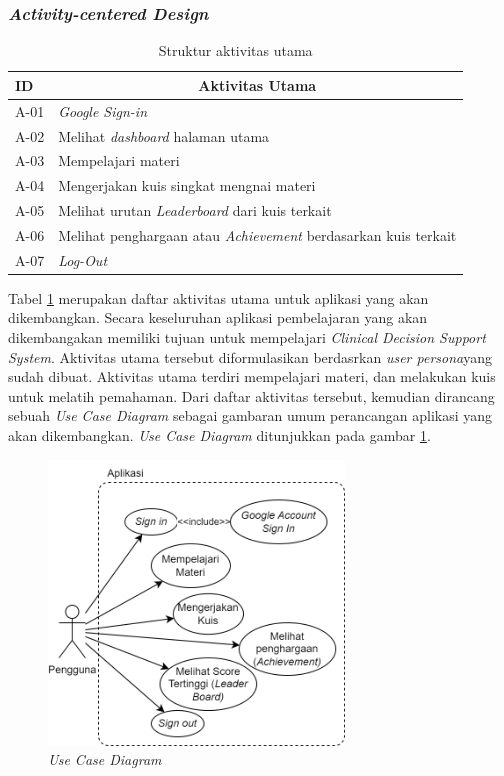\subsubsection{\textit{Activity-centered Design}}
\begin{table}[H]
	\centering
	\caption{Struktur aktivitas utama}
	\begin{tabular}{|m{1cm}|m{}|}
		\hline
		\centering \textbf{ID} & \multicolumn{1}{c|}{\centering \textbf{Aktivitas Utama}}\\
		\hline
		A-01 & \textit{Google Sign-in} \\
		\hline
		A-02 & Melihat \textit{dashboard} halaman utama\\
		\hline
		A-03 & Mempelajari materi\\
		\hline
		A-04 & Mengerjakan kuis singkat mengnai materi \\
		\hline
		A-05 & Melihat urutan \textit{Leaderboard} dari kuis terkait\\
		\hline
		A-06 & Melihat penghargaan atau \textit{Achievement} berdasarkan kuis terkait \\
		\hline
		A-07 & \textit{Log-Out}\\
		\hline
	\end{tabular}
	\label{Tab: Tabel Main Activity}
\end{table}
Tabel \ref*{Tab: Tabel Main Activity} merupakan daftar aktivitas utama untuk aplikasi yang akan dikembangkan.
Secara keseluruhan aplikasi pembelajaran yang akan dikembangakan memiliki tujuan untuk mempelajari \textit{Clinical Decision Support System}. 
Aktivitas utama tersebut diformulasikan berdasrkan \textit{user persona}yang sudah dibuat. Aktivitas utama terdiri mempelajari materi, dan melakukan kuis untuk melatih pemahaman.
Dari daftar aktivitas tersebut, kemudian dirancang sebuah \textit{Use Case Diagram} sebagai gambaran umum perancangan aplikasi yang akan dikembangkan. \textit{Use Case Diagram} ditunjukkan pada gambar \ref*{Fig:Use Case Diagram}. 
\begin{figure}[H]
	\centering
	\includegraphics[width=0.7\textwidth]{contents/chapter-3/images/Use-Case-Diagram.png}
	\caption{\textit{Use Case Diagram}}
	\label{Fig:Use Case Diagram}
\end{figure}

